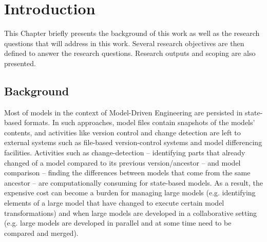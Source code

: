 \documentclass[12pt, a4paper]{report} \usepackage[titletoc]{appendix}
\begin{document}
\tableofcontents
{}

\listoffigures
\newpage
 
\listoftables
\newpage

\lstlistoflistings
\newpage

\chapter{Introduction}
\label{ch:introduction}
This Chapter briefly presents the background of this work as well as the research questions that will address in this work. Several research objectives are then defined to answer the research questions. Research outputs and scoping are also presented. 

\section{Background}
\label{sec:background}
Most of models in the context of Model-Driven Engineering are persisted in state-based formats. In such approaches, model files contain snapshots of the models' contents, and activities like version control and change detection are left to external systems such as file-based version-control systems and model differencing facilities. Activities such as change-detection -- identifying parts that already changed of a model compared to its previous version/ancestor -- and model comparison -- finding the differences between models that come from the same ancestor -- are computationally consuming for state-based models. As a result, the expensive cost can become a burden for managing large models (e.g. identifying elements of a large model that have changed to execute certain model transformations) and when large models are developed in a collaborative setting (e.g. large models are developed in parallel and at some time  need to be compared and merged).
\end{document}

